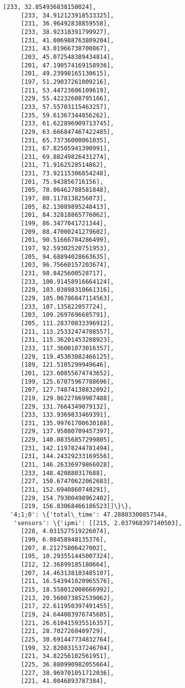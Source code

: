\documentclass[11pt]{article}
\begin{document}
\begin{tcolorbox}[breakable, size=fbox, boxrule=.5pt, pad at break*=1mm, opacityfill=0]
\begin{Verbatim}[commandchars=\\\{\}]
     [233, 32.854936838150024],
     [233, 34.912123918533325],
     [231, 36.96492838859558],
     [233, 38.92318391799927],
     [231, 41.006988763809204],
     [231, 43.01966738700867],
     [203, 45.072548389434814],
     [201, 47.190574169158936],
     [201, 49.23998165130615],
     [197, 51.29037261009216],
     [211, 53.44723606109619],
     [229, 55.42232608795166],
     [233, 57.55703115463257],
     [235, 59.61367344856262],
     [233, 61.622896909713745],
     [229, 63.666847467422485],
     [231, 65.73736000061035],
     [231, 67.82505941390991],
     [231, 69.88249826431274],
     [231, 71.9162528514862],
     [231, 73.92115306854248],
     [201, 75.943856716156],
     [205, 78.06462788581848],
     [197, 80.1178138256073],
     [205, 82.13089895248413],
     [201, 84.32818865776062],
     [199, 86.3477041721344],
     [209, 88.47000241279602],
     [201, 90.51666784286499],
     [197, 92.59302520751953],
     [205, 94.68894028663635],
     [203, 96.75660157203674],
     [231, 98.8425600528717],
     [233, 100.91458916664124],
     [229, 103.03898310661316],
     [229, 105.06786847114563],
     [233, 107.135822057724],
     [203, 109.2697696685791],
     [205, 111.28370833396912],
     [211, 113.25332474708557],
     [231, 115.36201453208923],
     [233, 117.36001873016357],
     [229, 119.45303082466125],
     [189, 121.5105299949646],
     [201, 123.60855674743652],
     [199, 125.67075967788696],
     [207, 127.74874138832092],
     [219, 129.86227869987488],
     [229, 131.7664349079132],
     [233, 133.9369833469391],
     [231, 135.99761700630188],
     [229, 137.95080709457397],
     [229, 140.08356857299805],
     [231, 142.11978244781494],
     [231, 144.24329233169556],
     [231, 146.26336979866028],
     [233, 148.420880317688],
     [227, 150.67470622062683],
     [231, 152.6940860748291],
     [229, 154.79300498962402],
     [219, 156.83068466186523]]\}\},
  '4;1;0': \{'total\_time': 47.28803300857544,
   'sensors': \{'ipmi': [[215, 2.037968397140503],
     [228, 4.031527519226074],
     [199, 6.08458948135376],
     [207, 8.21275806427002],
     [195, 10.293551445007324],
     [212, 12.36899185180664],
     [207, 14.463138103485107],
     [211, 16.543941020965576],
     [215, 18.558012008666992],
     [213, 20.560073852539062],
     [217, 22.611950397491455],
     [219, 24.644083976745605],
     [221, 26.610415935516357],
     [221, 28.7027268409729],
     [225, 30.691447734832764],
     [199, 32.820831537246704],
     [221, 34.82256102561951],
     [225, 36.880990982055664],
     [227, 38.969701051712036],
     [221, 41.0846893787384],

\end{Verbatim}
\end{tcolorbox}
\end{document}

